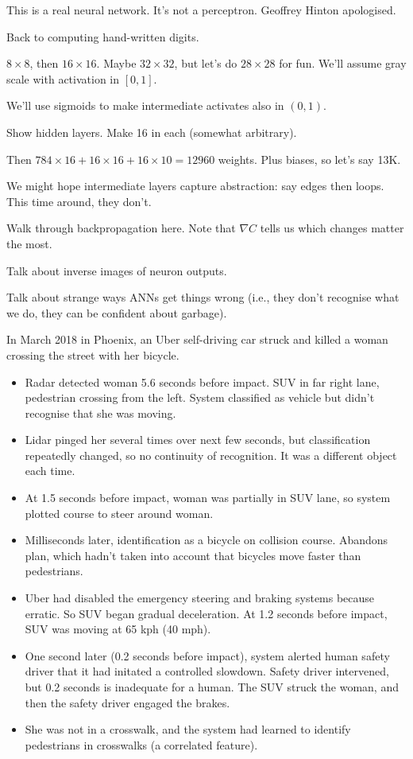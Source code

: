 This is a real neural network.  It's not a perceptron.  Geoffrey Hinton apologised.

Back to computing hand-written digits.

$8\times 8$, then $16\times 16$.  Maybe $32\times 32$, but let's do
$28\times 28$ for fun.  We'll assume gray scale with activation in
$[0,1]$.

We'll use sigmoids to make intermediate activates also in $(0,1)$.

Show hidden layers.  Make 16 in each (somewhat arbitrary).

Then $784\times 16 + 16\times 16 + 16 \times 10 = 12960$ weights.
Plus biases, so let's say 13K.

We might hope intermediate layers capture abstraction: say edges then
loops.  This time around, they don't.

Walk through backpropagation here.  Note that $\nabla C$ tells us
which changes matter the most.

Talk about inverse images of neuron outputs.

Talk about strange ways ANNs get things wrong (i.e., they don't
recognise what we do, they can be confident about garbage).



In March 2018 in Phoenix, an Uber self-driving car struck and killed a
woman crossing the street with her bicycle.

\begin{itemize}
\item Radar detected woman 5.6 seconds before impact.  SUV in far
  right lane, pedestrian crossing from the left.  System classified as
  vehicle but didn't recognise that she was moving.
\item Lidar pinged her several times over next few seconds, but
  classification repeatedly changed, so no continuity of recognition.
  It was a different object each time.
\item At 1.5 seconds before impact, woman was partially in SUV lane,
  so system plotted course to steer around woman.
\item Milliseconds later, identification as a bicycle on collision
  course.  Abandons plan, which hadn't taken into account that
  bicycles move faster than pedestrians.
\item Uber had disabled the emergency steering and braking systems
  because erratic.  So SUV began gradual deceleration.  At 1.2 seconds
  before impact, SUV was moving at 65 kph (40 mph).
\item One second later (0.2 seconds before impact), system alerted
  human safety driver that it had initated a controlled slowdown.
  Safety driver intervened, but 0.2 seconds is inadequate for a
  human.  The SUV struck the woman, and then the safety driver engaged
  the brakes.
\item She was not in a crosswalk, and the system had learned to
  identify pedestrians in crosswalks (a correlated feature).
\end{itemize}


